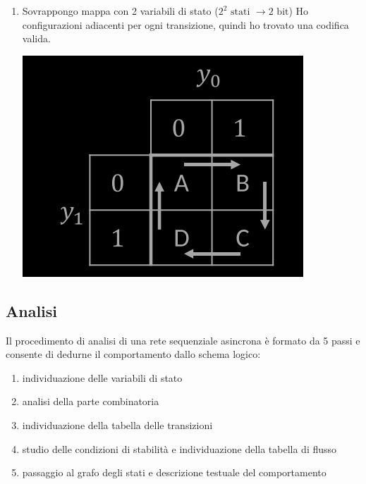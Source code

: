 \documentclass{article}
\begin{document}
\begin{enumerate}
\begin{center}
    \end{center}
    \item Sovrappongo mappa con 2 variabili di stato ($2^2 \text{ stati }\rightarrow 2 \text{ bit}$) Ho configurazioni adiacenti per ogni transizione, quindi ho trovato una codifica valida.
    \begin{center}
        \includegraphics[scale=0.35]{lampadaC3.png}
    \end{center}
\end{enumerate}
\subsection{Analisi}
Il procedimento di analisi di una rete sequenziale asincrona è formato da 5 passi e consente di dedurne il comportamento dallo schema logico:
\begin{enumerate}
    \item individuazione delle variabili di stato
    \item analisi della parte combinatoria
    \item individuazione della tabella delle transizioni
    \item studio delle condizioni di stabilità e individuazione della tabella di flusso
    \item passaggio al grafo degli stati e descrizione testuale del comportamento
\end{enumerate}
\clearpage
\end{document}
